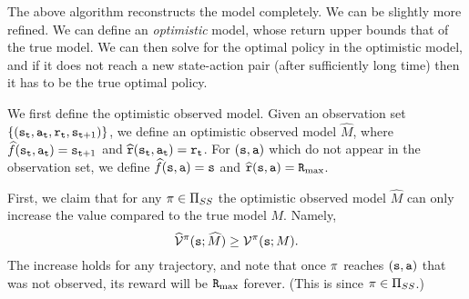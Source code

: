 The above algorithm reconstructs the model completely. We can be
slightly more refined. We can define an {\em optimistic} model, whose
return upper bounds that of the true model. We can then solve for
the optimal policy in the optimistic model, and if it does not reach a new state-action pair (after sufficiently long time) then it
has to be the true optimal policy.

\sloppy We first define the optimistic observed model. Given an observation
set $\{({\tt s}_{\tt t}, {\tt a}_{\tt t} ,{\tt r}_{\tt t}, 
{\tt s}_{{\tt t}+1})\}$, we define an optimistic observed model
$\widehat{M}$, where
$\widehat{f}({\tt s}_{\tt t},{\tt a}_{\tt t})={\tt s}_{{\tt t}+1}$ and
$\widehat{{\tt r}}({\tt s}_{\tt t},{\tt a}_{\tt t})={\tt r}_{\tt t}$.
%
For $({\tt s},{\tt a})$ which do not appear in the observation set,
we define $\widehat{f}({\tt s},{\tt a})={\tt s}$ and
$\widehat{{\tt r}}({\tt s},{\tt a})={\tt R}_{\max }$.

First, we claim that for any $\pi\in {\Pi _{SS}}$ the optimistic
observed model $\widehat{M}$ can only increase the value compared to
the true model $M$. Namely,
\[
\widehat{\mathcal{V}}^\pi({\tt s};\widehat{M})\geq \mathcal{V}^\pi({\tt s};M).
\]
The increase holds for any trajectory, and note that once $\pi$
reaches $({\tt s},{\tt a})$ that was not observed, its reward will be
${\tt R}_{\max }$ forever. (This is since $\pi\in {\Pi _{SS}}$.)

